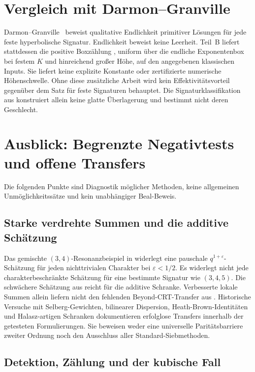 \documentclass[11pt,a4paper]{article}
\begin{document}
\section{Vergleich mit Darmon--Granville}

Darmon--Granville~\cite{DarmonGranville1995} beweist qualitative
Endlichkeit primitiver Lösungen für jede feste hyperbolische
Signatur. Endlichkeit beweist keine Leerheit.
Teil~B liefert stattdessen die positive Boxzählung
, uniform über die endliche Exponentenbox bei festem
$K$ und hinreichend großer Höhe, auf den angegebenen klassischen
Inputs. Sie liefert keine explizite Konstante oder zertifizierte
numerische Höhenschwelle. Ohne diese zusätzliche Arbeit wird kein
Effektivitätsvorteil gegenüber dem Satz für feste Signaturen behauptet.
Die Signaturklassifikation aus  konstruiert
allein keine glatte Überlagerung und bestimmt nicht deren Geschlecht.

\section{Ausblick: Begrenzte Negativtests und offene Transfers}
\label{sec:outlook}

Die folgenden Punkte sind Diagnostik möglicher Methoden, keine
allgemeinen Unmöglichkeitssätze und kein unabhängiger Beal-Beweis.

\subsection{Starke verdrehte Summen und die additive Schätzung}
\label{sec:outlook-elim1}

Das gemischte $(3,4)$-Resonanzbeispiel in
 widerlegt eine pauschale
$q^{1+\varepsilon}$-Schätzung für jeden nichttrivialen Charakter
bei $\varepsilon<1/2$. Es widerlegt nicht jede charakterbeschränkte
Schätzung für eine bestimmte Signatur wie $(3,4,5)$.
Die schwächere Schätzung aus  reicht für die additive
Schranke. Verbesserte lokale Summen allein liefern nicht den
fehlenden Beyond-CRT-Transfer aus .
Historische Versuche mit Selberg-Gewichten, bilinearer Dispersion,
Heath-Brown-Identitäten und Halasz-artigen Schranken
\cite{BFI1986,HB1982,HalaszPretentious} dokumentieren erfolglose
Transfers innerhalb der getesteten Formulierungen. Sie beweisen
weder eine universelle Paritätsbarriere zweiter Ordnung noch den
Ausschluss aller Standard-Siebmethoden.

\subsection{Detektion, Zählung und der kubische Fall}
\label{sec:outlook-elim2}
\end{document}
